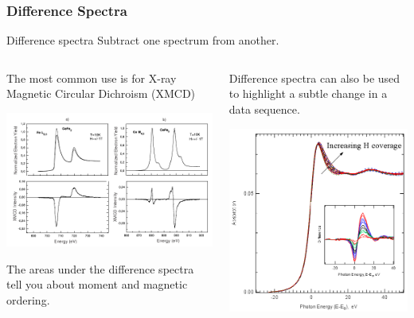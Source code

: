 \documentclass[10pt, xcolor=x11names, compress]{beamer}
\begin{document}
\begin{frame}
  \frametitle{Difference Spectra}

  \begin{block}{Difference spectra}
    Subtract one spectrum from another.
  \end{block}

  \small

  \begin{columns} [T]
    \begin{column}{0.6\linewidth}
      The most common use is for X-ray Magnetic Circular Dichroism
      (XMCD)

      \includegraphics[width=0.9\linewidth]{images/xmcd.png}

      The areas under the difference spectra tell you about moment and
      magnetic ordering.
    \end{column}
    \begin{column}{0.4\linewidth}
      Difference spectra can also be used to highlight a subtle change
      in a data sequence.

      \includegraphics[width=0.9\linewidth]{images/HPt.png}


\end{column}
\end{columns}
\end{frame}
\end{document}

